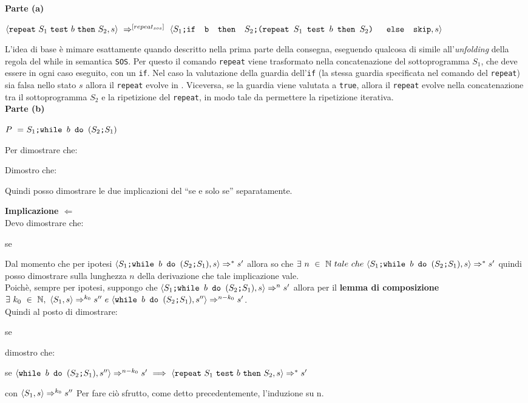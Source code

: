 {
	\hspace*{\textwidth-}

	\textbf{Parte (a)}
	\begin{center}
	$\confSs{\repeatSbS{S_1}{b}{S_2}}{s}~\Rar{[repeat_{sos}]}~
	\confSs{\concat
	{$S_1$}
	{\ifABC{b}{\concat
	{$S_2$}
	{(\repeatSbS{$S_1$}{$b$}{$S_2$})}
	}{\skipistr}}
	}{s}$
	\end{center}
	L'idea di base è mimare esattamente quando descritto nella prima parte
	della consegna, eseguendo qualcosa di simile all'\emph{unfolding} della
	regola del while in semantica \texttt{SOS}. Per questo il comando
	\texttt{repeat} viene trasformato nella concatenazione del sottoprogramma
	$S_1$, che deve essere in ogni caso eseguito, con un \texttt{if}. Nel caso
	la valutazione della guardia dell'\texttt{if} (la stessa guardia
	specificata nel comando del \texttt{repeat}) sia falsa nello stato $s$
	allora il \texttt{repeat} evolve in \skipistr{}. Viceversa, se la guardia
	viene valutata a \texttt{true}, allora il \texttt{repeat} evolve nella
	concatenazione tra il sottoprogramma $S_2$ e la ripetizione del 
	\texttt{repeat}, in modo tale da permettere la ripetizione iterativa.\\

	\textbf{Parte (b)}
	\begin{center}
	$P~=~\PDef{}$
	\end{center}
	Per dimostrare che:
	\begin{center}
	\exThreeB{}
	\end{center}
	Dimostro che:
	\begin{center}
	\exThreeIff{}
	\end{center}
	Quindi posso dimostrare le due implicazioni del ``se e solo se''
	separatamente.

	\textbf{Implicazione $\Longleftarrow$}\\
	Devo dimostrare che:
	\begin{center}
	se \exThreeRtL{}
	\end{center}
	Dal momento che per ipotesi $\confSs{\PDef{}}{s}\Rar{*}s'$ allora so che
	$\exists{}~n~\in~\mathbb{N}~tale~che~\confSs{\PDef{}}{s}\Rar{*}s'$ quindi
	posso dimostrare sulla lunghezza $n$ della derivazione che tale
	implicazione vale.\\
	Poichè, sempre per ipotesi, suppongo che $\confSs{\PDef{}}{s}\Rar{n}s'$
	allora per il \textbf{lemma di composizione} $\exists{}~k_0~\in~\mathbb{N},~
	\langle{}S_1, s\rangle{}\Rightarrow^{k_0}s''~e~
	\langle{}\mbox{\normalfont{\texttt{while }}} b \textrm{\normalfont{\texttt{ do }}} (\textrm{\normalfont{\texttt{$S_2$;$S_1$}}}), s''\rangle{}\Rightarrow^{n-k_0}s'$.\\
	Quindi al posto di dimostrare:
	\begin{center}
	se \exThreeRtL{}
	\end{center}
	dimostro che:
	\begin{center}
	se $\langle{}\mbox{\normalfont{\texttt{while }}} b \textrm{\normalfont{\texttt{ do }}} (\textrm{\normalfont{\texttt{$S_2$;$S_1$}}}), s''\rangle{}\Rightarrow^{n-k_0}s'~
	\Longrightarrow~\langle{}\texttt{repeat}~S_1~\texttt{test}~b~\texttt{then}~S_2, s\rangle{}\Rightarrow^{*}s'$
	\end{center}
	con $\langle{}S_1, s\rangle{}\Rightarrow^{k_0}s''$
	Per fare ciò sfrutto, come detto precedentemente, l'induzione su n.

}
